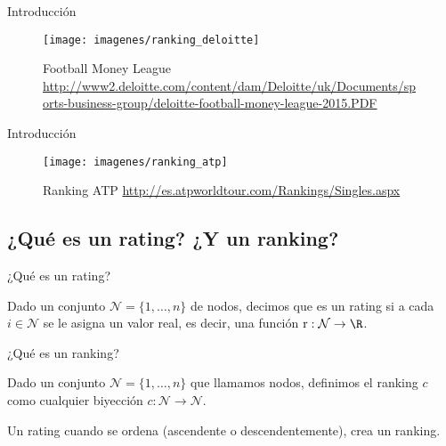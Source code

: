 \documentclass[10pt]{beamer}
\begin{document}
	\begin{frame}{Introducción}
		\begin{figure}
			\centering
			\texttt{[image: imagenes/ranking\_deloitte]}
			\caption{Football Money League \url{http://www2.deloitte.com/content/dam/Deloitte/uk/Documents/sports-business-group/deloitte-football-money-league-2015.PDF}}
			\label{fig:ranking_deloitte}
		\end{figure}
	\end{frame}
	
	\begin{frame}{Introducción}
		\begin{figure}
			\centering
			\texttt{[image: imagenes/ranking\_atp]}
			\caption{Ranking ATP \url{http://es.atpworldtour.com/Rankings/Singles.aspx}}
			\label{fig:ranking_atp}
		\end{figure}
	\end{frame}
	
	\subsection{¿Qué es un rating? ¿Y un ranking?}
	
	\begin{frame}{¿Qué es un rating?}
		\begin{defi}
			Dado un conjunto $\mathcal{N} = \{1,\dots, n\}$ de nodos, decimos que es un rating si a cada $i \in \mathcal{N}$ se le asigna un valor real, es decir, una función $\mathrm{r} : \mathcal{N} \to \R$.
		\end{defi}
	\end{frame}
	
	\begin{frame}{¿Qué es un ranking?}
		\begin{defi} \label{def:ranking}
			Dado un conjunto $\mathcal{N} = \{1,\dots,n\}$ que llamamos nodos, definimos el ranking $c$ como cualquier biyección $c : \mathcal{N} \to \mathcal{N}$.
		\end{defi}
		
		Un rating cuando se ordena (ascendente o descendentemente), crea un ranking.
	\end{frame}
	
\end{document}
